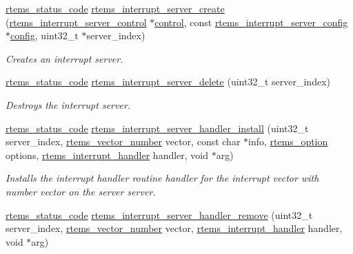 \begin{DoxyCompactItemize}
\mbox{\hyperlink{group__ClassicStatus_ga545d41846817eaba6143d52ee4d9e9fe}{rtems\+\_\+status\+\_\+code}} \mbox{\hyperlink{group__rtems__interrupt__extension_gad7725dd729bfd34f36c0de4d9c326abc}{rtems\+\_\+interrupt\+\_\+server\+\_\+create}} (\mbox{\hyperlink{structrtems__interrupt__server__control}{rtems\+\_\+interrupt\+\_\+server\+\_\+control}} $\ast$\mbox{\hyperlink{structcontrol}{control}}, const \mbox{\hyperlink{structrtems__interrupt__server__config}{rtems\+\_\+interrupt\+\_\+server\+\_\+config}} $\ast$\mbox{\hyperlink{structconfig__s}{config}}, uint32\+\_\+t $\ast$server\+\_\+index)
\begin{DoxyCompactList}\small\item\em Creates an interrupt server. \end{DoxyCompactList}\item 
\mbox{\hyperlink{group__ClassicStatus_ga545d41846817eaba6143d52ee4d9e9fe}{rtems\+\_\+status\+\_\+code}} \mbox{\hyperlink{group__rtems__interrupt__extension_gaa1093bab07e2fe4be3ea1025ea5d15a7}{rtems\+\_\+interrupt\+\_\+server\+\_\+delete}} (uint32\+\_\+t server\+\_\+index)
\begin{DoxyCompactList}\small\item\em Destroys the interrupt server. \end{DoxyCompactList}\item 
\mbox{\hyperlink{group__ClassicStatus_ga545d41846817eaba6143d52ee4d9e9fe}{rtems\+\_\+status\+\_\+code}} \mbox{\hyperlink{group__rtems__interrupt__extension_ga591084dbfb85313364d6591fef1768bc}{rtems\+\_\+interrupt\+\_\+server\+\_\+handler\+\_\+install}} (uint32\+\_\+t server\+\_\+index, \mbox{\hyperlink{group__ClassicINTR_ga3e434c197d99f128e78cae4d9358bd8b}{rtems\+\_\+vector\+\_\+number}} vector, const char $\ast$info, \mbox{\hyperlink{group__ClassicOptions_gad26685eb0e60a9650082935c31920e29}{rtems\+\_\+option}} options, \mbox{\hyperlink{group__rtems__interrupt__extension_gab39bd096ab2c3b41d03dace0e9777b08}{rtems\+\_\+interrupt\+\_\+handler}} handler, void $\ast$arg)
\begin{DoxyCompactList}\small\item\em Installs the interrupt handler routine {\itshape handler} for the interrupt vector with number {\itshape vector} on the server {\itshape server}. \end{DoxyCompactList}\item 
\mbox{\hyperlink{group__ClassicStatus_ga545d41846817eaba6143d52ee4d9e9fe}{rtems\+\_\+status\+\_\+code}} \mbox{\hyperlink{group__rtems__interrupt__extension_gad7840f288b1572dbcbe871b380e4eca7}{rtems\+\_\+interrupt\+\_\+server\+\_\+handler\+\_\+remove}} (uint32\+\_\+t server\+\_\+index, \mbox{\hyperlink{group__ClassicINTR_ga3e434c197d99f128e78cae4d9358bd8b}{rtems\+\_\+vector\+\_\+number}} vector, \mbox{\hyperlink{group__rtems__interrupt__extension_gab39bd096ab2c3b41d03dace0e9777b08}{rtems\+\_\+interrupt\+\_\+handler}} handler, void $\ast$arg)

\end{DoxyCompactItemize}
